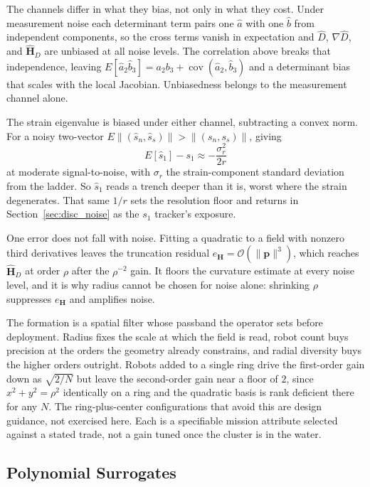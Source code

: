\documentclass[lettersize,journal]{IEEEtran}
\begin{document}
The channels differ in what they bias, not only in what they cost.
Under measurement noise each determinant term pairs one $\hat{a}$ with
one $\hat{b}$ from independent components, so the cross terms vanish in
expectation and $\hat{D}$, $\nabla\hat{D}$, and $\hat{\mathbf{H}}_D$
are unbiased at all noise levels. The correlation above breaks that
independence, leaving $E[\hat{a}_2\hat{b}_3] = a_2 b_3 +
\operatorname{cov}(\hat{a}_2, \hat{b}_3)$ and a determinant bias that
scales with the local Jacobian. Unbiasedness belongs to the measurement
channel alone.

The strain eigenvalue is biased under either channel, subtracting a
convex norm. For a noisy two-vector $E\lVert(\hat{s}_n,
\hat{s}_s)\rVert > \lVert(s_n, s_s)\rVert$, giving
\begin{equation}
    E[\hat{s}_1] - s_1 \approx -\frac{\sigma_r^2}{2r}
    \label{eq:s1_bias}
\end{equation}
at moderate signal-to-noise, with $\sigma_r$ the strain-component
standard deviation from the ladder. So $\hat{s}_1$ reads a trench
deeper than it is, worst where the strain degenerates. That same $1/r$
sets the resolution floor and returns in Section~\ref{sec:disc_noise}
as the $s_1$ tracker's exposure.

One error does not fall with noise. Fitting a quadratic to a field with
nonzero third derivatives leaves the truncation residual
$e_{\mathbf{H}} = \mathcal{O}(\lVert\mathbf{p}\rVert^3)$, which reaches
$\hat{\mathbf{H}}_D$ at order $\rho$ after the $\rho^{-2}$ gain. It
floors the curvature estimate at every noise level, and it is why
radius cannot be chosen for noise alone: shrinking $\rho$ suppresses
$e_{\mathbf{H}}$ and amplifies noise.

The formation is a spatial filter whose passband the operator sets
before deployment. Radius fixes the scale at which the field is
read, robot count buys precision at the orders the geometry already
constrains, and radial diversity buys the higher orders outright.
Robots added to a single ring drive the first-order gain down as $\sqrt{2/N}$ but leave the second-order gain near a floor of $2$, since $x^2 + y^2 = \rho^2$ identically on a ring and the quadratic basis is rank deficient there for any $N$. The ring-plus-center configurations that avoid this are design guidance, not exercised here. Each is a
specifiable mission attribute selected against a stated trade, not a
gain tuned once the cluster is in the water.

\subsection{Polynomial Surrogates}
\label{sec:surrogates}
\end{document}
